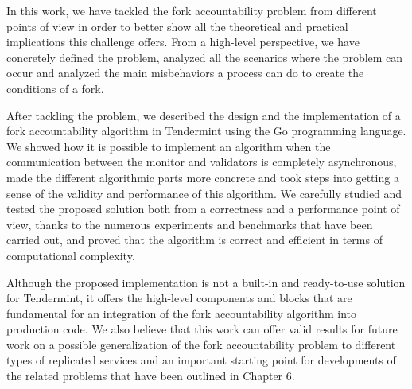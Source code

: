 \documentclass[a4paper,11pt,oneside]{report}
\begin{document}
In this work, we have tackled the fork accountability problem from different points of view in order to better show all the theoretical and practical implications this challenge offers. From a high-level perspective, we have concretely defined the problem, analyzed all the scenarios where the problem can occur and analyzed the main misbehaviors a process can do to create the conditions of a fork.

After tackling the problem, we described the design and the implementation of a fork accountability algorithm in Tendermint using the Go programming language. We showed how it is possible to implement an algorithm when the communication between the monitor and validators is completely asynchronous, made the different algorithmic parts more concrete and took steps into getting a sense of the validity and performance of this algorithm. We carefully studied and tested the proposed solution both from a correctness and a performance point of view, thanks to the numerous experiments and benchmarks that have been carried out, and proved that the algorithm is correct and efficient in terms of computational complexity. 

Although the proposed implementation is not a built-in and ready-to-use solution for Tendermint, it offers the high-level components and blocks that are fundamental for an integration of the fork accountability algorithm into production code. We also believe that this work can offer valid results for future work on a possible generalization of the fork accountability problem to different types of replicated services and an important starting point for developments of the related problems that have been outlined in Chapter 6.

\makeacks


\cleardoublepage
{}
{}
\printbibliography

%
%
\end{document}

